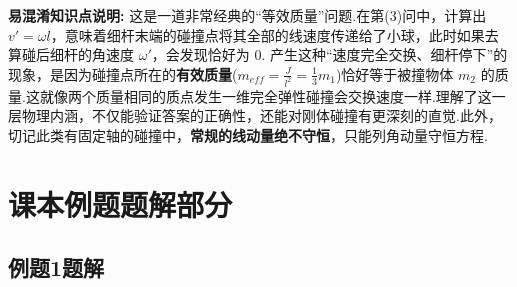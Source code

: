 \vspace{1em}

\textbf{易混淆知识点说明:}
这是一道非常经典的“等效质量”问题.在第(3)问中，计算出 $v' = \omega l$，意味着细杆末端的碰撞点将其全部的线速度传递给了小球，此时如果去算碰后细杆的角速度 $\omega'$，会发现恰好为 $0$.
产生这种“速度完全交换、细杆停下”的现象，是因为碰撞点所在的\textbf{有效质量}($m_{eff} = \frac{J}{l^2} = \frac{1}{3}m_1$)恰好等于被撞物体 $m_2$ 的质量.这就像两个质量相同的质点发生一维完全弹性碰撞会交换速度一样.理解了这一层物理内涵，不仅能验证答案的正确性，还能对刚体碰撞有更深刻的直觉.此外，切记此类有固定轴的碰撞中，\textbf{常规的线动量绝不守恒}，只能列角动量守恒方程.


\section{课本例题题解部分}

\subsection{例题1题解}

